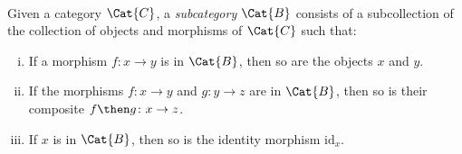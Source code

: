 \
\begin{shaded}
\begin{definition}[Subcategory]
\label{def:subcategory}
	Given a category $\Cat{C}$, a \emph{subcategory} $\Cat{B}$ consists of a subcollection of the collection of objects and morphisms of $\Cat{C}$ such that:
	\begin{enumerate}[(i)]
	\item If a morphism $f \colon x\to y$ is in $\Cat{B}$, then so are the objects $x$ and $y$.
	\item If the morphisms $f\colon x\to y$ and $g\colon y\to z$ are in $\Cat{B}$, then so is their composite $f\then g\colon x\to z$.
	\item If $x$ is in $\Cat{B}$, then so is the identity morphism $\text{id}_x$.
	\end{enumerate}
\end{definition}
\end{shaded}
